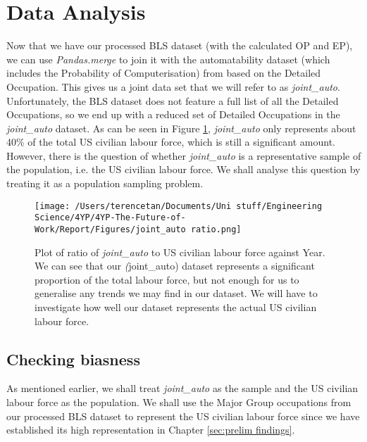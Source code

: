 \documentclass[11pt]{article}
\begin{document}
\section{Data Analysis}

Now that we have our processed BLS dataset (with the calculated OP and EP), we can use \emph{Pandas.merge} to join it with the automatability dataset (which includes the Probability of Computerisation) from \cite{futureofemployment} based on the Detailed Occupation. This gives us a joint data set that we will refer to as \emph{joint\_auto}. Unfortunately, the BLS dataset does not feature a full list of all the Detailed Occupations, so we end up with a reduced set of Detailed Occupations in the \emph{joint\_auto} dataset. As can be seen in Figure \ref{fig:jointautoratio}, \emph{joint\_auto} only represents about 40\% of the total US civilian labour force, which is still a significant amount. However, there is the question of whether \emph{joint\_auto} is a representative sample of the population, i.e. the US civilian labour force. We shall analyse this question by treating it as a population sampling problem.

\begin{figure}[!htb]
	\centering
	\texttt{[image: /Users/terencetan/Documents/Uni stuff/Engineering Science/4YP/4YP-The-Future-of-Work/Report/Figures/joint\_auto ratio.png]}
	\caption{Plot of ratio of \emph{joint\_auto} to US civilian labour force against Year. We can see that our \emph(joint\_auto) dataset represents a significant proportion of the total labour force, but not enough for us to generalise any trends we may find in our dataset. We will have to investigate how well our dataset represents the actual US civilian labour force.}
	\label{fig:jointautoratio}
\end{figure}


\subsection{Checking biasness}
\label{subsec:Checking biasness}
As mentioned earlier, we shall treat \emph{joint\_auto} as the sample and the US civilian labour force as the population. We shall use the Major Group occupations from our processed BLS dataset to represent the US civilian labour force since we have established its high representation in Chapter \ref{sec:prelim findings}.
\end{document}
